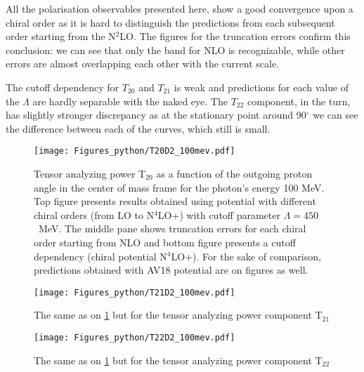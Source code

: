     All the polarisation observables presented here, show a good convergence 
    upon a chiral order as it is hard to distinguish the predictions
    from each subsequent order starting from the N$^2$LO. The figures 
    for the truncation errors confirm this conclusion: we can see that only the band
    for NLO is recognizable, while other errors are almost overlapping 
    each other with the current scale. 

    The cutoff dependency for $T_{20}$ and $T_{21}$ is weak and 
    predictions for each value of the $\Lambda$ are hardly separable 
    with the naked eye. The $T_{22}$ component, in the turn, 
    has slightly stronger discrepancy as at the stationary point around 90$^\circ$
    we can see the difference between each of the curves, which still is small.


    \begin{figure}[h]
        \begin{center}
        \texttt{[image: Figures\_python/T20D2\_100mev.pdf]}
        \end{center}
        \caption{Tensor analyzing power T$_{20}$ 
        as a function of the outgoing proton angle in the center of mass frame 
        for the photon's energy 100 MeV.
        Top figure presents results obtained using potential
        with different chiral orders (from LO to N$^4$LO+) with cutoff parameter $\Lambda=450$~MeV.
        The middle pane shows truncation errors for each 
        chiral order starting from NLO and
        bottom figure presents a cutoff dependency (chiral potential N$^4$LO+).
        For the sake of comparison, predictions obtained with AV18 potential are on  figures as well.}
        \label{T20_100_vert}
    \end{figure}

    \begin{figure}[h]
        \begin{center}
        \texttt{[image: Figures\_python/T21D2\_100mev.pdf]}
        \end{center}
        \caption{The same as on \ref{T20_100_vert} but for the 
        tensor analyzing power component T$_{21}$}
        \label{T21_100_vert}
    \end{figure}
      

    \begin{figure}[h]
        \begin{center}
        \texttt{[image: Figures\_python/T22D2\_100mev.pdf]}
        \end{center}
        \caption{The same as on \ref{T20_100_vert} but for the 
        tensor analyzing power component T$_{22}$}
        \label{T22_100_vert}
    \end{figure}

